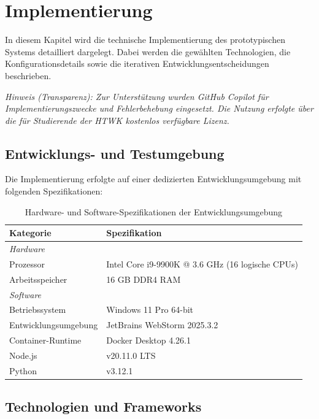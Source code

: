 \chapter{Implementierung}
\label{chap:implementierung}

\noindent In diesem Kapitel wird die technische Implementierung des prototypischen Systems detailliert dargelegt. Dabei werden die gewählten Technologien, die Konfigurationsdetails sowie die iterativen Entwicklungsentscheidungen beschrieben.

\noindent\textit{Hinweis (Transparenz): Zur Unterstützung wurden GitHub Copilot für Implementierungszwecke und Fehlerbehebung eingesetzt. Die Nutzung erfolgte über die für Studierende der HTWK kostenlos verfügbare Lizenz.}

\section{Entwicklungs- und Testumgebung}

Die Implementierung erfolgte auf einer dedizierten Entwicklungsumgebung mit folgenden Spezifikationen:

\begin{table}[htbp]
\centering
\caption{Hardware- und Software-Spezifikationen der Entwicklungsumgebung}
\label{tab:dev-environment}
\begin{tabular}{ll}
\toprule
\textbf{Kategorie} & \textbf{Spezifikation} \\
\midrule
\multicolumn{2}{l}{\textit{Hardware}} \\
Prozessor & Intel Core i9-9900K @ 3.6 GHz (16 logische CPUs) \\
Arbeitsspeicher & 16 GB DDR4 RAM \\
\midrule
\multicolumn{2}{l}{\textit{Software}} \\
Betriebssystem & Windows 11 Pro 64-bit \\
Entwicklungsumgebung & JetBrains WebStorm 2025.3.2 \\
Container-Runtime & Docker Desktop 4.26.1 \\
Node.js & v20.11.0 LTS \\
Python & v3.12.1 \\
\midrule
\bottomrule
\end{tabular}
\end{table}
\section{Technologien und Frameworks}

